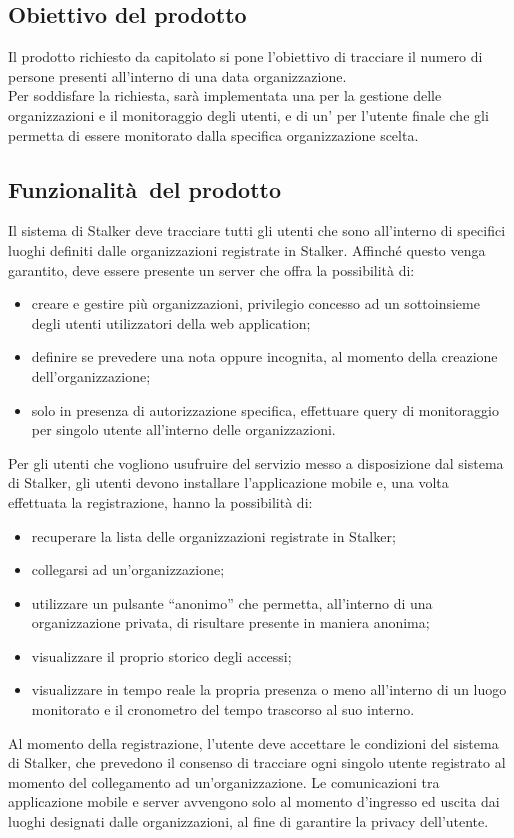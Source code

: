 \documentclass[../analisi-dei-requisiti.tex]{subfiles}
\begin{document}
\subsection{Obiettivo del prodotto}%
\label{sub:obiettivo_del_prodotto}
Il prodotto richiesto da capitolato si pone l'obiettivo di tracciare il numero di persone presenti all’interno di una data organizzazione.\\
Per soddisfare la richiesta, sarà implementata una  per la gestione delle organizzazioni e il monitoraggio degli utenti, e
di un' per l'utente finale che gli permetta di essere monitorato dalla specifica organizzazione scelta.


\subsection{Funzionalità del prodotto}%
\label{sub:funzionalita_del_prodotto}
Il sistema di Stalker deve tracciare tutti gli utenti che sono all'interno di specifici luoghi definiti dalle organizzazioni registrate in Stalker.
Affinché questo venga garantito, deve essere presente un server che offra la possibilità di:
\begin{itemize}
  \item creare e gestire più organizzazioni, privilegio concesso ad un sottoinsieme degli utenti utilizzatori della web application;
  \item definire se prevedere una  nota oppure incognita, al momento della creazione dell'organizzazione;
  \item solo in presenza di autorizzazione specifica, effettuare query di monitoraggio per singolo utente all’interno delle organizzazioni.
\end{itemize}

Per gli utenti che vogliono usufruire del servizio messo a disposizione dal sistema di Stalker, gli utenti devono installare l'applicazione mobile
e, una volta effettuata la registrazione, hanno la possibilità di:
\begin{itemize}
  \item recuperare la lista delle organizzazioni registrate in Stalker;
  \item collegarsi ad un'organizzazione;
  \item utilizzare un pulsante “anonimo” che permetta, all’interno di una organizzazione privata, di risultare presente in maniera anonima;
  \item visualizzare il proprio storico degli accessi;
  \item visualizzare in tempo reale la propria presenza o meno all’interno di un luogo monitorato e il cronometro del tempo trascorso al suo interno.
\end{itemize}
Al momento della registrazione, l'utente deve accettare le condizioni del sistema di Stalker, che prevedono il consenso di tracciare
ogni singolo utente registrato al momento del collegamento ad un'organizzazione.
Le comunicazioni tra applicazione mobile e server avvengono solo al momento d'ingresso ed uscita dai luoghi designati dalle organizzazioni, al fine di garantire
la privacy dell'utente.
\end{document}
